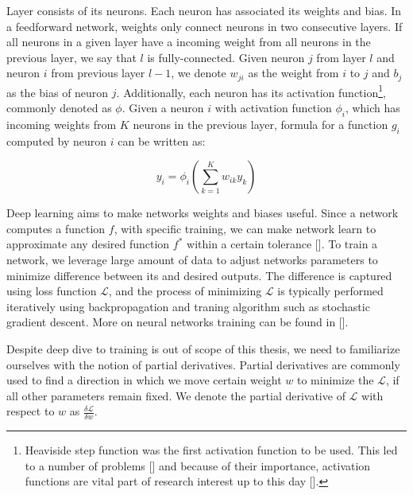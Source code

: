Layer consists of its neurons. Each neuron has associated its weights and bias. In a feedforward network, weights only connect neurons in two consecutive layers. If all neurons in a given layer have a incoming weight from all neurons in the previous layer, we say that $l$ is fully-connected. Given neuron $j$ from layer $l$ and neuron $i$ from previous layer $l - 1$, we denote $w_{ji}$ as the weight from $i$ to $j$ and $b_j$ as the bias of neuron $j$. Additionally, each neuron has its activation function\footnote{Heaviside step function was the first activation function to be used. This led to a number of problems [] and because of their importance, activation functions are vital part of research interest up to this day [].}, commonly denoted as $\phi$. Given a neuron $i$ with activation function $\phi_i$, which has incoming weights from $K$ neurons in the previous layer, formula for a function $g_i$ computed by neuron $i$ can be written as:

\begin{equation}
y_i = \phi_i(\sum_{k=1}^K w_{ik}y_k)
\end{equation}

Deep learning aims to make networks weights and biases useful. Since a network computes a function $f$, with specific training, we can make network learn to approximate any desired function $f^*$ within a certain tolerance []. To train a network, we leverage large amount of data to adjust networks parameters to minimize difference between its and desired outputs. The difference is captured using loss function $\mathcal{L}$, and the process of minimizing $\mathcal{L}$ is typically performed iteratively using backpropagation and traning algorithm such as stochastic gradient descent. More on neural networks training can be found in []. 

Despite deep dive to training is out of scope of this thesis, we need to familiarize ourselves with the notion of partial derivatives. Partial derivatives are commonly used to find a direction in which we move certain weight $w$ to minimize the $\mathcal{L}$, if all other parameters remain fixed. We denote the partial derivative of $\mathcal{L}$ with respect to $w$ as $\frac{\delta \mathcal{L}}{\delta w}$. 


